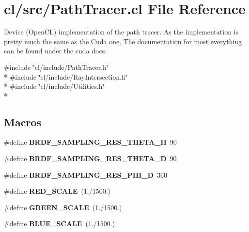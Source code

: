 \hypertarget{PathTracer_8cl}{\section{cl/src/\-Path\-Tracer.cl File Reference}
\label{PathTracer_8cl}
}


Device (Open\-C\-L) implementation of the path tracer. As the implementation is pretty much the same as the Cuda one. The documentation for most everything can be found under the cuda docs.  


{\ttfamily \#include \char`\"{}cl/include/\-Path\-Tracer.\-h\char`\"{}}\\*
{\ttfamily \#include \char`\"{}cl/include/\-Ray\-Intersection.\-h\char`\"{}}\\*
{\ttfamily \#include \char`\"{}cl/include/\-Utilities.\-h\char`\"{}}\\*
\subsection*{Macros}
\begin{DoxyCompactItemize}
\item 
\hypertarget{PathTracer_8cl_a8dc71902a3c956140d3533820b1ef731}{\#define {\bfseries B\-R\-D\-F\-\_\-\-S\-A\-M\-P\-L\-I\-N\-G\-\_\-\-R\-E\-S\-\_\-\-T\-H\-E\-T\-A\-\_\-\-H}~90}\label{PathTracer_8cl_a8dc71902a3c956140d3533820b1ef731}

\item 
\hypertarget{PathTracer_8cl_a91bb2b846851bbcfbf4d5e0040c867df}{\#define {\bfseries B\-R\-D\-F\-\_\-\-S\-A\-M\-P\-L\-I\-N\-G\-\_\-\-R\-E\-S\-\_\-\-T\-H\-E\-T\-A\-\_\-\-D}~90}\label{PathTracer_8cl_a91bb2b846851bbcfbf4d5e0040c867df}

\item 
\hypertarget{PathTracer_8cl_aa2ccfe1ed7a38e1147f3ede37fadc3cc}{\#define {\bfseries B\-R\-D\-F\-\_\-\-S\-A\-M\-P\-L\-I\-N\-G\-\_\-\-R\-E\-S\-\_\-\-P\-H\-I\-\_\-\-D}~360}\label{PathTracer_8cl_aa2ccfe1ed7a38e1147f3ede37fadc3cc}

\item 
\hypertarget{PathTracer_8cl_acf3f1b403789e38a95ccb2407c151be5}{\#define {\bfseries R\-E\-D\-\_\-\-S\-C\-A\-L\-E}~(1./1500.)}\label{PathTracer_8cl_acf3f1b403789e38a95ccb2407c151be5}

\item 
\hypertarget{PathTracer_8cl_adcde58c7b09df0bb410fbabd1fddaf3c}{\#define {\bfseries G\-R\-E\-E\-N\-\_\-\-S\-C\-A\-L\-E}~(1./1500.)}\label{PathTracer_8cl_adcde58c7b09df0bb410fbabd1fddaf3c}

\item 
\hypertarget{PathTracer_8cl_ab4be50e26575571331b47f2df98916a5}{\#define {\bfseries B\-L\-U\-E\-\_\-\-S\-C\-A\-L\-E}~(1./1500.)}\label{PathTracer_8cl_ab4be50e26575571331b47f2df98916a5}

\end{DoxyCompactItemize}
